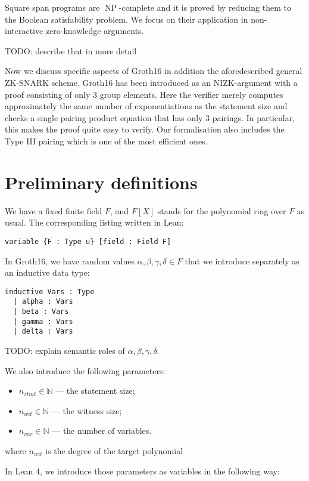 \documentclass{article}
\theoremstyle{definition}
\theoremstyle{remark}
\begin{document}
Square span programs are $\operatorname{NP}$-complete and it is proved by reducing them to the Boolean satisfability problem. 
We focus on their application in non-interactive zero-knowledge arguments.

TODO: describe that in more detail

Now we discuss specific aspects of Groth16 in addition the aforedescribed general ZK-SNARK scheme.
Groth16 has been introduced as an NIZK-argument with a proof consisting of only 3 group elements.
Here the verifier merely computes approximately the same number of exponentiations as the statement size
and checks a single pairing product equation that has only 3 pairings. 
In particular, this makes the proof quite easy to verify. 
Our formalisation also includes the Type III pairing which is one of the most efficient ones.

\section{Preliminary definitions}

We have a fixed finite field $F$, and $F[X]$ stands for the polynomial ring over $F$ as usual. The corresponding listing written in Lean:

\begin{lstlisting}
variable {F : Type u} [field : Field F]
\end{lstlisting}

In Groth16, we have random values $\alpha, \beta, \gamma, \delta \in F$ that we introduce separately as an inductive data type:
\begin{lstlisting}
inductive Vars : Type
  | alpha : Vars
  | beta : Vars
  | gamma : Vars
  | delta : Vars
\end{lstlisting}
TODO: explain semantic roles of $\alpha, \beta, \gamma, \delta$.

We also introduce the following parameters:

\begin{itemize}
\item $n_{stmt} \in \mathbb{N}$ --- the statement size;
\item $n_{wit} \in \mathbb{N}$ --- the witness size;
\item $n_{var} \in \mathbb{N}$ --- the number of variables.
\end{itemize}
where $n_{wit}$ is the degree of the target polynomial

In Lean 4, we introduce those parameters as variables in the following way:
\end{document}
